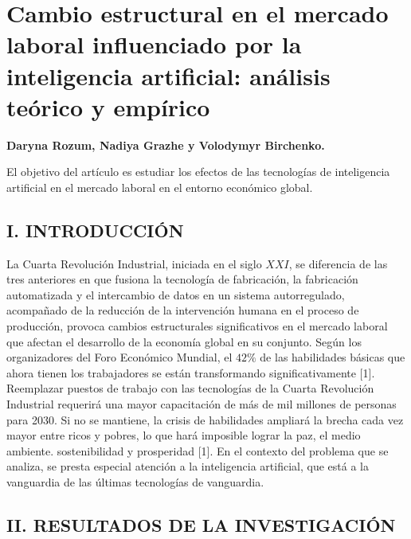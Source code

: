 \chapter*{Cambio estructural en el mercado laboral influenciado por la inteligencia artificial: análisis teórico y empírico}

\begin{center}
    \textbf{Daryna Rozum, Nadiya Grazhe y Volodymyr Birchenko.}
\end{center}

El objetivo del artículo es estudiar los efectos de las tecnologías de inteligencia artificial en el mercado laboral en el entorno económico global. 

\section*{\center I. INTRODUCCIÓN}
La Cuarta Revolución Industrial, iniciada en el siglo $XXI$, se diferencia de las tres anteriores en que fusiona la tecnología de fabricación, la fabricación automatizada y el intercambio de datos en un sistema autorregulado, acompañado de la reducción de la intervención humana en el proceso de producción, provoca cambios estructurales significativos en el mercado laboral que afectan el desarrollo de la economía global en su conjunto. Según los organizadores del Foro Económico Mundial, el $42 \%$ de las habilidades básicas que ahora tienen los trabajadores se están transformando significativamente [1].\\

Reemplazar puestos de trabajo con las tecnologías de la Cuarta Revolución Industrial requerirá una mayor capacitación de más de mil millones de personas para 2030. Si no se mantiene, la crisis de habilidades ampliará la brecha cada vez mayor entre ricos y pobres, lo que hará imposible lograr la paz, el medio ambiente. sostenibilidad y prosperidad [1]. En el contexto del problema que se analiza, se presta especial atención a la inteligencia artificial, que está a la vanguardia de las últimas tecnologías de vanguardia.

\section*{\center II. RESULTADOS DE LA INVESTIGACIÓN}

